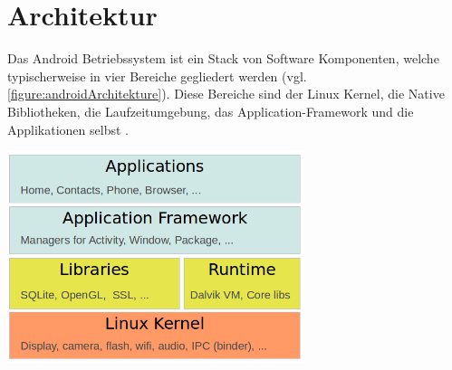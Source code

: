 \section{Architektur}
Das Android Betriebssystem ist ein Stack von Software Komponenten, welche typischerweise in vier Bereiche gegliedert werden (vgl. \ref{figure:androidArchitekture}). Diese Bereiche sind der Linux Kernel, die Native Bibliotheken, die Laufzeitumgebung, das Application-Framework und die Applikationen selbst \cite{androidTutorialOS}. \\

\begin{minipage}{\textwidth} 
	\centering	
	\includegraphics[width=0.65\textwidth]{figures/android_stack.png}
	\label{figure:androidArchitekture}
	\vspace{2ex}
\end{minipage}

